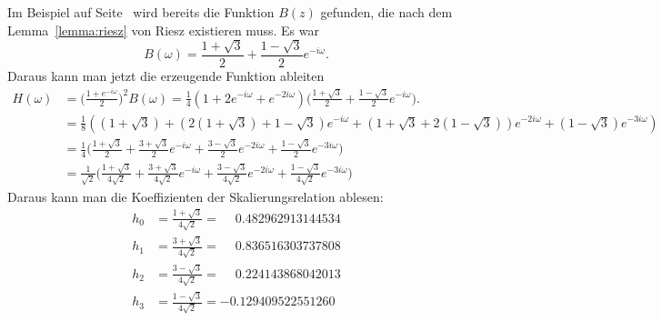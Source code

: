 Im Beispiel auf Seite~\pageref{buch:kompakt:db2riesz} wird bereits
die Funktion $B(z)$ gefunden, die nach dem Lemma~\ref{lemma:riesz}
von Riesz existieren muss.
Es war
\[
B(\omega)
=
\frac{1+\sqrt{3}}2 + \frac{1-\sqrt{3}}2e^{-i\omega}.
\]
Daraus kann man jetzt die erzeugende Funktion ableiten
\begin{align*}
H(\omega)
&=
\biggl(\frac{1+e^{-i\omega}}2\biggr)^2 B(\omega)
=
\frac14(1+2e^{-i\omega}+e^{-2i\omega})
\biggl(
\frac{1+\sqrt{3}}2 + \frac{1-\sqrt{3}}2e^{-i\omega}
\biggr).
\\
&=
\frac18(
(1+\sqrt{3})
+
(2(1+\sqrt{3})+1-\sqrt{3}) e^{-i\omega}
+
(1+\sqrt{3}+2(1-\sqrt{3})) e^{-2i\omega}
+
(1-\sqrt{3})e^{-3i\omega}
)
\\
&=
\frac14\biggl(
\frac{1+\sqrt{3}}2
+
\frac{3+\sqrt{3}}2 e^{-i\omega}
+
\frac{3-\sqrt{3}}2 e^{-2i\omega}
+
\frac{1-\sqrt{3}}2 e^{-3i\omega}
\biggr)
\\
&=
\frac1{\sqrt{2}}
\biggl(
\frac{1+\sqrt{3}}{4\sqrt{2}}
+
\frac{3+\sqrt{3}}{4\sqrt{2}} e^{-i\omega}
+
\frac{3-\sqrt{3}}{4\sqrt{2}} e^{-2i\omega}
+
\frac{1-\sqrt{3}}{4\sqrt{2}} e^{-3i\omega}
\biggr)
\end{align*}
Daraus kann man die Koeffizienten der Skalierungsrelation ablesen:
\begin{align*}
h_0
&=
\frac{1+\sqrt{3}}{4\sqrt{2}}
=
\phantom{-}
0.482962913144534
\\
h_1
&=
\frac{3+\sqrt{3}}{4\sqrt{2}}
=
\phantom{-}
0.836516303737808
\\
h_2
&=
\frac{3-\sqrt{3}}{4\sqrt{2}}
=
\phantom{-}
0.224143868042013
\\
h_3
&=
\frac{1-\sqrt{3}}{4\sqrt{2}}
=
-0.129409522551260
\end{align*}




